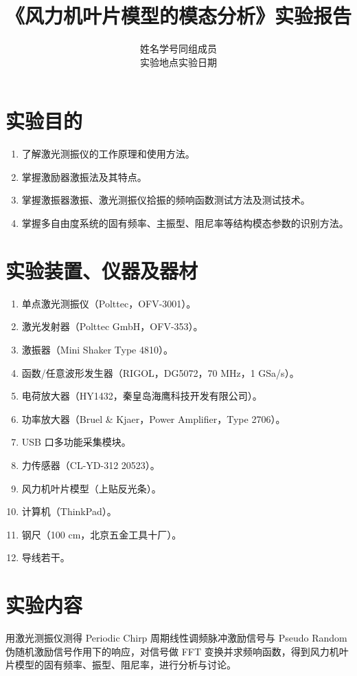\documentclass[UTF8,a4paper,12pt]{ctexart}
\title{《风力机叶片模型的模态分析》实验报告}
\author{姓名\blank[2.5cm] \quad 学号\blank[3cm] \quad 同组成员\blank[4cm]\\[1em]
实验地点\blank[3cm] \quad 实验日期\blank[4cm]}
\date{}
\numberwithin{equation}{section}
\begin{document}
\maketitle
\tableofcontents
\clearpage

\section{实验目的}
\begin{enumerate}
  \item 了解激光测振仪的工作原理和使用方法。
  \item 掌握激励器激振法及其特点。
  \item 掌握激振器激振、激光测振仪拾振的频响函数测试方法及测试技术。
  \item 掌握多自由度系统的固有频率、主振型、阻尼率等结构模态参数的识别方法。
\end{enumerate}

\section{实验装置、仪器及器材}
\begin{enumerate}
  \item 单点激光测振仪（Polttec，OFV-3001）。
  \item 激光发射器（Polttec GmbH，OFV-353）。
  \item 激振器（Mini Shaker Type 4810）。
  \item 函数/任意波形发生器（RIGOL，DG5072，70 MHz，1 GSa/s）。
  \item 电荷放大器（HY1432，秦皇岛海鹰科技开发有限公司）。
  \item 功率放大器（Bruel \& Kjaer，Power Amplifier，Type 2706）。
  \item USB 口多功能采集模块。
  \item 力传感器（CL-YD-312 20523）。
  \item 风力机叶片模型（上贴反光条）。
  \item 计算机（ThinkPad）。
  \item 钢尺（100 cm，北京五金工具十厂）。
  \item 导线若干。
\end{enumerate}

\section{实验内容}
用激光测振仪测得 Periodic Chirp 周期线性调频脉冲激励信号与 Pseudo Random 伪随机激励信号作用下的响应，对信号做 FFT 变换并求频响函数，得到风力机叶片模型的固有频率、振型、阻尼率，进行分析与讨论。
\end{document}
